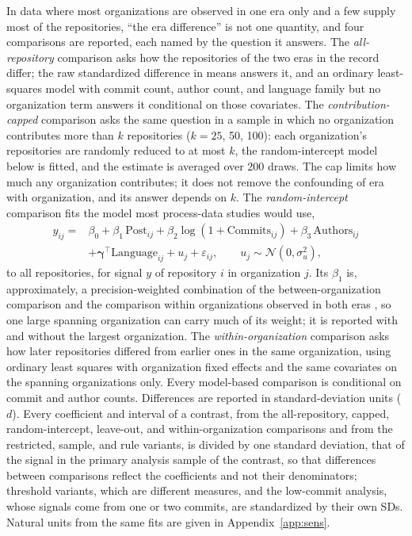 \documentclass[acmsmall,screen,review,anonymous]{acmart}
\begin{document}
In data where most organizations are observed in one era only and a few supply most of the repositories, ``the era difference'' is not one quantity, and four comparisons are reported, each named by the question it answers. The \textit{all-repository} comparison asks how the repositories of the two eras in the record differ; the raw standardized difference in means answers it, and an ordinary least-squares model with commit count, author count, and language family but no organization term answers it conditional on those covariates. The \textit{contribution-capped} comparison asks the same question in a sample in which no organization contributes more than $k$ repositories ($k = 25$, 50, 100): each organization's repositories are randomly reduced to at most $k$, the random-intercept model below is fitted, and the estimate is averaged over 200 draws. The cap limits how much any organization contributes; it does not remove the confounding of era with organization, and its answer depends on $k$. The \textit{random-intercept} comparison fits the model most process-data studies would use,
\begin{equation}
\begin{split}
y_{ij} = {}& \beta_0 + \beta_1\,\mathrm{Post}_{ij} + \beta_2 \log(1 + \mathrm{Commits}_{ij}) + \beta_3\,\mathrm{Authors}_{ij} \\
& + \boldsymbol{\gamma}^\top \mathrm{Language}_{ij} + u_j + \varepsilon_{ij}, \qquad u_j \sim \mathcal{N}(0, \sigma_u^2),
\end{split}
\label{eq:era}
\end{equation}
to all repositories, for signal $y$ of repository $i$ in organization $j$. Its $\beta_1$ is, approximately, a precision-weighted combination of the between-organization comparison and the comparison within organizations observed in both eras \citep{raudenbush2002hlm, yaremych2023centering}, so one large spanning organization can carry much of its weight; it is reported with and without the largest organization. The \textit{within-organization} comparison asks how later repositories differed from earlier ones in the same organization, using ordinary least squares with organization fixed effects and the same covariates on the spanning organizations only. Every model-based comparison is conditional on commit and author counts. Differences are reported in standard-deviation units ($d$). Every coefficient and interval of a contrast, from the all-repository, capped, random-intercept, leave-out, and within-organization comparisons and from the restricted, sample, and rule variants, is divided by one standard deviation, that of the signal in the primary analysis sample of the contrast, so that differences between comparisons reflect the coefficients and not their denominators; threshold variants, which are different measures, and the low-commit analysis, whose signals come from one or two commits, are standardized by their own SDs. Natural units from the same fits are given in Appendix~\ref{app:sens}.
\end{document}
